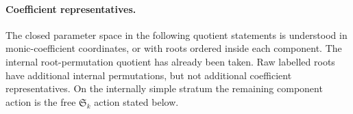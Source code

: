 \documentclass[11pt,reqno]{amsart}
\numberwithin{equation}{section}
\theoremstyle{definition}\newtheorem{definition}[theorem]{Definition}
\theoremstyle{remark}\newtheorem{remark}[theorem]{Remark}
\begin{document}




\paragraph{Coefficient representatives.}
The closed parameter space in the following quotient statements is
understood in monic-coefficient coordinates, or with roots ordered
inside each component. The internal root-permutation quotient has
already been taken. Raw labelled roots have additional internal
permutations, but not additional coefficient representatives. On the
internally simple stratum the remaining component action is the free
$\mathfrak S_k$ action stated below.


















\end{document}
